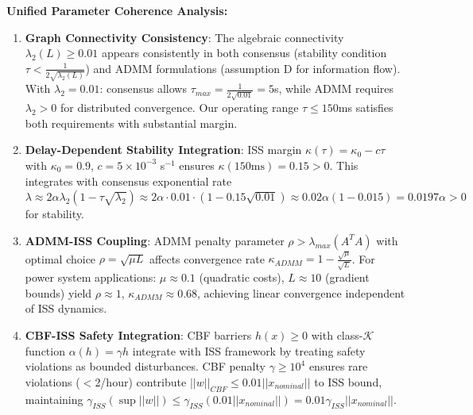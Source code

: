 \documentclass[12pt]{article}
\begin{document}
\textbf{Unified Parameter Coherence Analysis:}
\begin{enumerate}
\item \textbf{Graph Connectivity Consistency}: The algebraic connectivity $\lambda_2(L) \geq 0.01$ appears consistently in both consensus (stability condition $\tau < \frac{1}{2\sqrt{\lambda_2(L)}}$) and ADMM formulations (assumption D for information flow). With $\lambda_2 = 0.01$: consensus allows $\tau_{max} = \frac{1}{2\sqrt{0.01}} = 5$s, while ADMM requires $\lambda_2 > 0$ for distributed convergence. Our operating range $\tau \leq 150$ms satisfies both requirements with substantial margin.
\item \textbf{Delay-Dependent Stability Integration}: ISS margin $\kappa(\tau) = \kappa_0 - c\tau$ with $\kappa_0 = 0.9$, $c = 5 \times 10^{-3}$ s$^{-1}$ ensures $\kappa(150\text{ms}) = 0.15 > 0$. This integrates with consensus exponential rate $\lambda \approx 2\alpha\lambda_2(1-\tau\sqrt{\lambda_2}) \approx 2\alpha \cdot 0.01 \cdot (1-0.15\sqrt{0.01}) \approx 0.02\alpha(1-0.015) = 0.0197\alpha > 0$ for stability.
\item \textbf{ADMM-ISS Coupling}: ADMM penalty parameter $\rho > \lambda_{max}(A^TA)$ with optimal choice $\rho = \sqrt{\mu L}$ affects convergence rate $\kappa_{ADMM} = 1-\frac{\sqrt{\mu}}{\sqrt{L}}$. For power system applications: $\mu \approx 0.1$ (quadratic costs), $L \approx 10$ (gradient bounds) yield $\rho \approx 1$, $\kappa_{ADMM} \approx 0.68$, achieving linear convergence independent of ISS dynamics.
\item \textbf{CBF-ISS Safety Integration}: CBF barriers $h(x) \geq 0$ with class-$\mathcal{K}$ function $\alpha(h) = \gamma h$ integrate with ISS framework by treating safety violations as bounded disturbances. CBF penalty $\gamma \geq 10^4$ ensures rare violations ($<$2/hour) contribute $||w||_{CBF} \leq 0.01||x_{nominal}||$ to ISS bound, maintaining $\gamma_{ISS}(\sup||w||) \leq \gamma_{ISS}(0.01||x_{nominal}||) = 0.01\gamma_{ISS}||x_{nominal}||$.
\end{enumerate}
\end{document}
